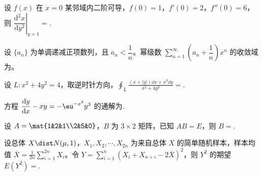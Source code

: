 \begin{question}[index=11]
设 $f(x)$ 在 $x=0$ 某邻域内二阶可导，$f(0)=1$，$f'(0)=2$，$f''(0)=6$，则 $\left.\dfrac{\mathrm d^2x}{\mathrm dy^2}\right|_{y=1}=$\fillin.
\end{question}
\QuestionBreak

\begin{question}[index=12]
设 $\{a_n\}$ 为单调递减正项数列，且 $a_n<\dfrac1n$。幂级数 $\displaystyle\sum_{n=1}^{\infty}\left(a_n+\dfrac1n\right)x^n$ 的\allowbreak\mbox{收敛域}为\fillin。
\end{question}
\QuestionBreak

\begin{question}[index=13]
设 $L\colon x^2+4y^2=4$，取逆时针方向，$\displaystyle\oint_L\frac{(x+|y|)\dd x+x^3\dd y}{x^2+4y^2}=$\fillin.
\end{question}
\QuestionBreak

\begin{question}[index=14]
方程 $\dfrac{\mathrm dy}{\mathrm dx}-xy=-\eu^{-x^2}y^3$ 的通解为\fillin.
\end{question}
\QuestionBreak

\begin{question}[index=15]
设 $A=\mat{1&2&1\\2&5&0}$，$B$ 为 $3\times2$ 矩阵，已知 $AB=E$，则 $B=$\fillin.
\end{question}
\QuestionBreak

\begin{question}[index=16]
设总体 $X\dist N(\mu,1)$，$X_1,X_2,\cdots,X_{2n}$ 为来自总体 $X$ 的简单随机样本，样本均值 $\displaystyle\overline X=\frac1{2n}\sum_{i=1}^{2n}X_i$。令 $\displaystyle Y=\sum_{i=1}^n(X_i+X_{n+i}-2\overline X)^2$，则 $Y^2$ 的期望 $E(Y^2)=$\fillin.
\end{question}
